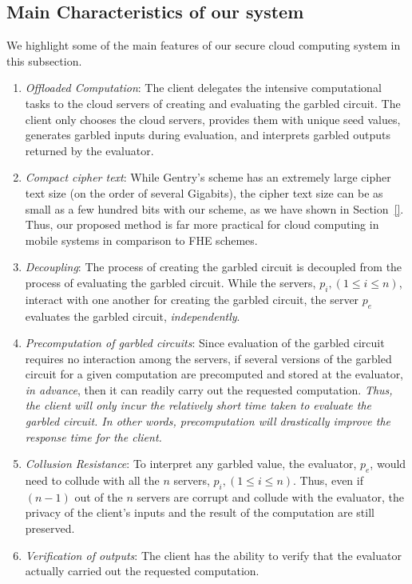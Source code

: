 \documentclass[10pt,journal,cspaper,compsoc]{IEEEtran}
\begin{document}
\subsection{Main Characteristics of our system}
\label{sec_features_of_our_secure_cloud_computing_model}
We highlight some of the main features of our secure cloud computing system in this subsection.
\begin{enumerate}
    \item{{\em Offloaded Computation}: The client delegates the intensive computational tasks to the cloud servers of creating and evaluating the garbled circuit. The client only chooses the cloud servers, provides them with unique seed values, generates garbled inputs during evaluation, and interprets garbled outputs returned by the evaluator.}

    \item{{\em Compact cipher text}: While Gentry's scheme has an extremely large cipher text size (on the order of several Gigabits), the cipher text size can be as small as a few hundred bits with our scheme, as we have shown in Section~\ref{}. Thus, our proposed method is far more practical for cloud computing in mobile systems in comparison to FHE schemes.}

    \item{{\em Decoupling}: The process of creating the garbled circuit is decoupled from the process of evaluating the garbled circuit. While the servers, $p_i, (1\le i\le n)$, interact with one another for creating the garbled circuit, the server $p_e$ evaluates the garbled circuit, {\em independently}.}

    \item{{\em Precomputation of garbled circuits}: Since evaluation of the garbled circuit requires no interaction among the servers, if several versions of the garbled circuit for a given computation are precomputed and stored at the evaluator, {\em in advance}, then it can readily carry out the requested computation. {\em Thus, the client will only incur the relatively short time taken to evaluate the garbled circuit. In other words, precomputation will drastically improve the response time for the client.}}

    \item{{\em Collusion Resistance}: To interpret any garbled value, the evaluator, $p_e$, would need to collude with all the $n$ servers, $p_i, (1\le i\le n)$. Thus, even if $(n-1)$ out of the $n$ servers are corrupt and collude with the evaluator, the privacy of the client's inputs and the result of the computation are still preserved.}

    \item{{\em Verification of outputs}: The client has the ability to verify that the evaluator actually carried out the requested computation. }
\end{enumerate}
\end{document}
